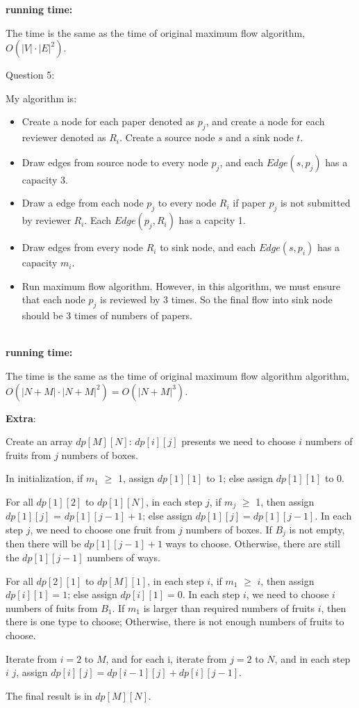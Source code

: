 \documentclass[12pt]{article}
\begin{document}
\textbf{running time:} \par
The time is the same as the time of original maximum flow algorithm, $O(|V|\cdot|E|^2)$.




\pagebreak
\noindent
\large Question 5: \par
\normalsize 
My algorithm is:
\begin{itemize}
  \item	Create a node for each paper denoted as $p_j$, and create a node for each reviewer denoted as $R_i$. Create a source node $s$ and a sink node $t$.
  \item Draw edges from source node to every node $p_j$, and each $Edge(s, p_j)$ has a capacity $3$. 
  \item Draw a edge from each node $p_j$ to every node $R_i$ if paper $p_j$ is not submitted by reviewer $R_i$.  
	Each $Edge(p_j, R_i)$ has a capcity 1. 
  \item Draw edges from every node $R_i$ to sink node, and each $Edge(s, p_i)$ has a capacity $m_i$.
  \item Run maximum flow algorithm. 
	However, in this algorithm, we must ensure that each node $p_j$ is reviewed by 3 times. 
	So the final flow into sink node should be 3 times of numbers of papers.
\end{itemize}

\noindent \\
\textbf{running time:} \par
The time is the same as the time of original maximum flow algorithm algorithm, $O(|N + M|\cdot|N + M|^2) = O(|N + M|^3)$.



\pagebreak
\large \textbf{Extra}:\\ \vspace{5mm}\par
\normalsize 
Create an array $dp[M][N]$: $dp[i][j]$ presents we need to choose $i$ numbers of fruits from $j$ numbers of boxes. \par
In initialization, if $m_1$ $\geq$ 1, assign $dp[1][1]$ to 1; else assign $dp[1][1]$ to 0. \par
For all $dp[1][2]$ to $dp[1][N]$, in each step $j$, if $m_j$ $\geq$ 1, then assign $dp[1][j]$ = $dp[1][j - 1] + 1$; else assign $dp[1][j] = dp[1][j - 1]$. 
In each step $j$, we need to choose one fruit from $j$ numbers of boxes. 
If $B_j$ is not empty, then there will be $dp[1][j - 1] + 1$ ways to choose.
Otherwise, there are still the $dp[1][j - 1]$ numbers of ways. \par
For all $dp[2][1]$ to $dp[M][1]$, in each step $i$, if $m_1$ $\geq$ $i$, then assign $dp[i][1] = 1$; else assign $dp[i][1] = 0$. 
In each step $i$, we need to choose $i$ numbers of fuits from $B_1$.
If $m_1$ is larger than required numbers of fruits $i$, then there is one type to choose; 
Otherwise, there is not enough numbers of fruits to choose. \par
Iterate from $i = 2$ to $M$, and for each i, iterate from $j = 2$ to $N$, 
and in each step $i$ $j$, assign $dp[i][j] = dp[i - 1][j] + dp[i][j - 1]$. \par
The final result is in $dp[M][N]$.
\end{document}
